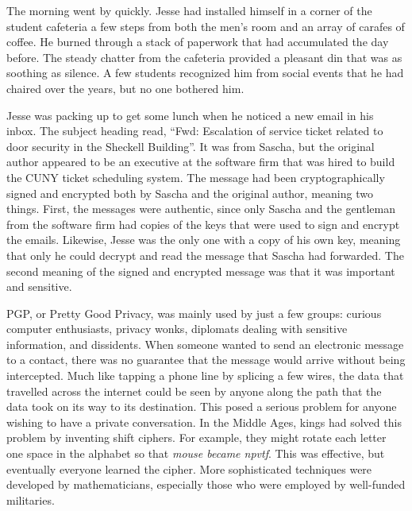 \documentclass[12pt]{book}
\begin{document}
The morning went by quickly.  Jesse had installed himself in a corner of the student cafeteria a few steps from both the men's room and an array of carafes of coffee.  He burned through a stack of paperwork that had accumulated the day before.  The steady chatter from the cafeteria provided a pleasant din that was as soothing as silence.  A few students recognized him from social events that he had chaired over the years, but no one bothered him.

Jesse was packing up to get some lunch when he noticed a new email in his inbox.  The subject heading read, ``Fwd: Escalation of service ticket related to door security in the Sheckell Building''.  It was from Sascha, but the original author appeared to be an executive at the software firm that was hired to build the CUNY ticket scheduling system.  The message had been cryptographically signed and encrypted both by Sascha and the original author, meaning two things.  First, the messages were authentic, since only Sascha and the gentleman from the software firm had copies of the keys that were used to sign and encrypt the emails.  Likewise, Jesse was the only one with a copy of his own key, meaning that only he could decrypt and read the message that Sascha had forwarded.  The second meaning of the signed and encrypted message was that it was important and sensitive.


PGP, or Pretty Good Privacy, was mainly used by just a few groups: curious computer enthusiasts, privacy wonks, diplomats dealing with sensitive information, and dissidents.  When someone wanted to send an electronic message to a contact, there was no guarantee that the message would arrive without being intercepted.  Much like tapping a phone line by splicing a few wires, the data that travelled across the internet could be seen by anyone along the path that the data took on its way to its destination.  This posed a serious problem for anyone wishing to have a private conversation.  In the Middle Ages, kings had solved this problem by inventing shift ciphers.  For example, they might rotate each letter one space in the alphabet so that \emph{mouse\emph{ became }npvtf}.  This was effective, but eventually everyone learned the cipher.  More sophisticated techniques were developed by mathematicians, especially those who were employed by well-funded militaries.
\end{document}
